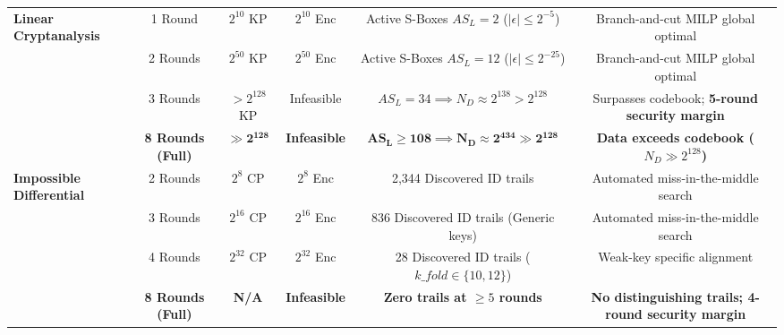 \documentclass[10pt,twocolumn]{article}
\begin{document}
\begin{table}[t]
{\begin{tabular}{@{}lccccc@{}}
\multirow{4}{*}{\textbf{Linear Cryptanalysis}} 
 & 1 Round  & $2^{10}$ KP & $2^{10}$ Enc & Active S-Boxes $AS_L = 2$ ($|\epsilon| \le 2^{-5}$) & Branch-and-cut MILP global optimal \\
 & 2 Rounds & $2^{50}$ KP & $2^{50}$ Enc & Active S-Boxes $AS_L = 12$ ($|\epsilon| \le 2^{-25}$) & Branch-and-cut MILP global optimal \\
 & 3 Rounds & $> 2^{128}$ KP & Infeasible & $AS_L = 34 \implies N_D \approx 2^{138} > 2^{128}$ & Surpasses codebook; \textbf{5-round security margin} \\
 & \textbf{8 Rounds (Full)} & $\mathbf{\gg 2^{128}}$ & \textbf{Infeasible} & $\mathbf{AS_L \ge 108 \implies N_D \approx 2^{434} \gg 2^{128}}$ & \textbf{Data exceeds codebook ($N_D \gg 2^{128}$)} \\ \midrule
\multirow{4}{*}{\textbf{Impossible Differential}} 
 & 2 Rounds & $2^8$ CP  & $2^8$ Enc  & 2,344 Discovered ID trails & Automated miss-in-the-middle search \\
 & 3 Rounds & $2^{16}$ CP & $2^{16}$ Enc & 836 Discovered ID trails (Generic keys) & Automated miss-in-the-middle search \\
 & 4 Rounds & $2^{32}$ CP & $2^{32}$ Enc & 28 Discovered ID trails ($\mathit{k\_fold} \in \{10, 12\}$) & Weak-key specific alignment \\
 & \textbf{8 Rounds (Full)} & \textbf{N/A} & \textbf{Infeasible} & \textbf{Zero trails at $\ge 5$ rounds} & \textbf{No distinguishing trails; 4-round security margin} \\ \bottomrule
\end{tabular}%
}
\end{table}
\end{document}
